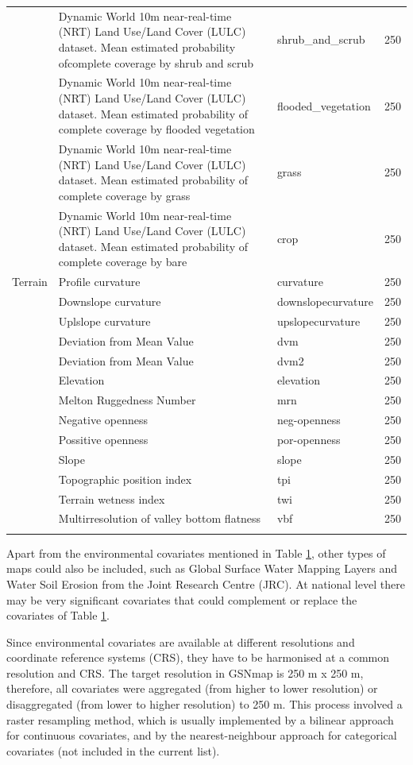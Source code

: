 \documentclass[
  10pt,
  b5paper,
  oneside]{book}
\begin{document}
\begin{longtable}{p{}  p{} p{} p{}}
        & Dynamic World 10m near-real-time (NRT) Land Use/Land Cover (LULC) dataset. Mean estimated probability ofcomplete coverage by shrub and scrub & shrub\_and\_scrub & 250 \\
        & Dynamic World 10m near-real-time (NRT) Land Use/Land Cover (LULC) dataset. Mean estimated probability of complete coverage by flooded vegetation & flooded\_vegetation & 250 \\
        & Dynamic World 10m near-real-time (NRT) Land Use/Land Cover (LULC) dataset. Mean estimated probability of complete coverage by grass & grass & 250 \\
        & Dynamic World 10m near-real-time (NRT) Land Use/Land Cover (LULC) dataset. Mean estimated probability of complete coverage by bare & crop & 250 \\ 
        \hline
        Terrain & Profile curvature & curvature & 250 \\
        & Downslope curvature & downslopecurvature & 250 \\
        & Uplslope curvature & upslopecurvature & 250 \\
        & Deviation from Mean Value & dvm & 250 \\
        & Deviation from Mean Value & dvm2 & 250 \\
        & Elevation & elevation & 250 \\
        & Melton Ruggedness Number & mrn & 250 \\
        & Negative openness & neg-openness & 250 \\
        & Possitive openness & por-openness & 250 \\
        & Slope & slope & 250 \\
        & Topographic position index & tpi & 250 \\
        & Terrain wetness index & twi & 250 \\
        & Multirresolution of valley bottom flatness & vbf & 250 \\
        \hline
\label{tab:covs}
\end{longtable}

Apart from the environmental covariates mentioned in Table \ref{tab:covs}, other types of maps could also be included, such as Global Surface Water Mapping Layers and Water Soil Erosion from the Joint Research Centre (JRC). At national level there may be very significant covariates that could complement or replace the covariates of Table \ref{tab:covs}.

Since environmental covariates are available at different resolutions and coordinate reference systems (CRS), they have to be harmonised at a common resolution and CRS. The target resolution in GSNmap is 250 m x 250 m, therefore, all covariates were aggregated (from higher to lower resolution) or disaggregated (from lower to higher resolution) to 250 m. This process involved a raster resampling method, which is usually implemented by a bilinear approach for continuous covariates, and by the nearest-neighbour approach for categorical covariates (not included in the current list).
\end{document}
